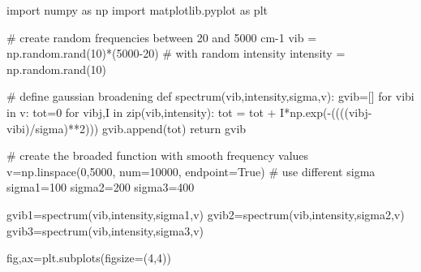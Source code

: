 \documentclass[
  letterpaper,
]{article}
\newenvironment{Shaded}{\begin{snugshade}}{\end{snugshade}}
\newcommand{\BuiltInTok}[1]{\textcolor[rgb]{0.00,0.23,0.31}{#1}}
\newcommand{\CommentTok}[1]{\textcolor[rgb]{0.37,0.37,0.37}{#1}}
\newcommand{\ControlFlowTok}[1]{\textcolor[rgb]{0.00,0.23,0.31}{#1}}
\newcommand{\DecValTok}[1]{\textcolor[rgb]{0.68,0.00,0.00}{#1}}
\newcommand{\ImportTok}[1]{\textcolor[rgb]{0.00,0.46,0.62}{#1}}
\newcommand{\KeywordTok}[1]{\textcolor[rgb]{0.00,0.23,0.31}{#1}}
\newcommand{\NormalTok}[1]{\textcolor[rgb]{0.00,0.23,0.31}{#1}}
\newcommand{\OperatorTok}[1]{\textcolor[rgb]{0.37,0.37,0.37}{#1}}
\newcommand{\VariableTok}[1]{\textcolor[rgb]{0.07,0.07,0.07}{#1}}
\begin{document}
\begin{Shaded}
\begin{Highlighting}[]
\ImportTok{import}\NormalTok{ numpy }\ImportTok{as}\NormalTok{ np}
\ImportTok{import}\NormalTok{ matplotlib.pyplot }\ImportTok{as}\NormalTok{ plt}

\CommentTok{\# create random frequencies between 20 and 5000 cm{-}1 }
\NormalTok{vib }\OperatorTok{=}\NormalTok{ np.random.rand(}\DecValTok{10}\NormalTok{)}\OperatorTok{*}\NormalTok{(}\DecValTok{5000}\OperatorTok{{-}}\DecValTok{20}\NormalTok{)}
\CommentTok{\# with random intensity}
\NormalTok{intensity }\OperatorTok{=}\NormalTok{ np.random.rand(}\DecValTok{10}\NormalTok{)}

\CommentTok{\# define gaussian broadening}
\KeywordTok{def}\NormalTok{ spectrum(vib,intensity,sigma,v):}
\NormalTok{    gvib}\OperatorTok{=}\NormalTok{[]}
    \ControlFlowTok{for}\NormalTok{ vibi }\KeywordTok{in}\NormalTok{ v:}
\NormalTok{        tot}\OperatorTok{=}\DecValTok{0}
        \ControlFlowTok{for}\NormalTok{ vibj,I }\KeywordTok{in} \BuiltInTok{zip}\NormalTok{(vib,intensity):}
\NormalTok{            tot }\OperatorTok{=}\NormalTok{ tot }\OperatorTok{+}\NormalTok{ I}\OperatorTok{*}\NormalTok{np.exp(}\OperatorTok{{-}}\NormalTok{((((vibj}\OperatorTok{{-}}\NormalTok{vibi)}\OperatorTok{/}\NormalTok{sigma)}\OperatorTok{**}\DecValTok{2}\NormalTok{)))}
\NormalTok{        gvib.append(tot)}
    \ControlFlowTok{return}\NormalTok{ gvib}

\CommentTok{\# create the broaded function with smooth frequency values}
\NormalTok{v}\OperatorTok{=}\NormalTok{np.linspace(}\DecValTok{0}\NormalTok{,}\DecValTok{5000}\NormalTok{, num}\OperatorTok{=}\DecValTok{10000}\NormalTok{, endpoint}\OperatorTok{=}\VariableTok{True}\NormalTok{)}
\CommentTok{\# use different sigma}
\NormalTok{sigma1}\OperatorTok{=}\DecValTok{100}
\NormalTok{sigma2}\OperatorTok{=}\DecValTok{200}
\NormalTok{sigma3}\OperatorTok{=}\DecValTok{400}

\NormalTok{gvib1}\OperatorTok{=}\NormalTok{spectrum(vib,intensity,sigma1,v)}
\NormalTok{gvib2}\OperatorTok{=}\NormalTok{spectrum(vib,intensity,sigma2,v)}
\NormalTok{gvib3}\OperatorTok{=}\NormalTok{spectrum(vib,intensity,sigma3,v)}

\NormalTok{fig,ax}\OperatorTok{=}\NormalTok{plt.subplots(figsize}\OperatorTok{=}\NormalTok{(}\DecValTok{4}\NormalTok{,}\DecValTok{4}\NormalTok{))}


\end{Highlighting}
\end{Shaded}
\end{document}
